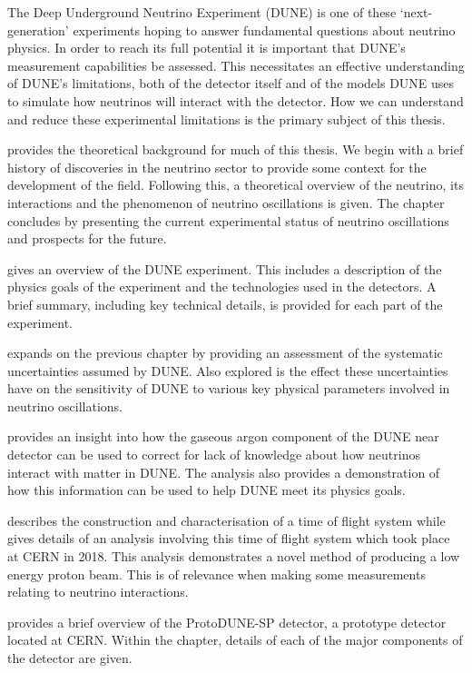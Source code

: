 The Deep Underground Neutrino Experiment (DUNE) is one of these `next-generation' experiments hoping to answer fundamental questions about neutrino physics.
In order to reach its full potential it is important that DUNE's measurement capabilities be assessed.
This necessitates an effective understanding of DUNE's limitations, both of the detector itself and of the models DUNE uses to simulate how neutrinos will interact with the detector.
How we can understand and reduce these experimental limitations is the primary subject of this thesis.

 provides the theoretical background for much of this thesis.
We begin with a brief history of discoveries in the neutrino sector to provide some context for the development of the field.
Following this, a theoretical overview of the neutrino, its interactions and the phenomenon of neutrino oscillations is given.
The chapter concludes by presenting the current experimental status of neutrino oscillations and prospects for the future.

 gives an overview of the DUNE experiment. 
This includes a description of the physics goals of the experiment and the technologies used in the detectors. 
A brief summary, including key technical details, is provided for each part of the experiment.

 expands on the previous chapter by providing an assessment of the systematic uncertainties assumed by DUNE.
Also explored is the effect these uncertainties have on the sensitivity of DUNE to various key physical parameters involved in neutrino oscillations.

 provides an insight into how the gaseous argon component of the DUNE near detector can be used to correct for lack of knowledge about how neutrinos interact with matter in DUNE.
The analysis also provides a demonstration of how this information can be used to help DUNE meet its physics goals.

 describes the construction and characterisation of a time of flight system while  gives details of an analysis involving this time of flight system which took place at CERN in 2018.
This analysis demonstrates a novel method of producing a low energy proton beam.
This is of relevance when making some measurements relating to neutrino interactions.

 provides a brief overview of the ProtoDUNE-SP detector, a prototype detector located at CERN.
Within the chapter, details of each of the major components of the detector are given.

